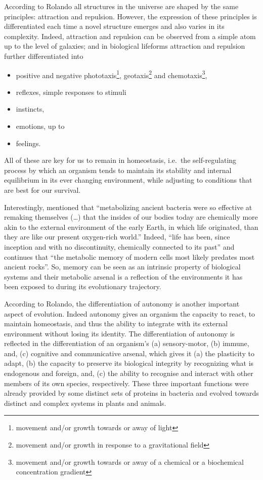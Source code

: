 \documentclass[
  11pt,
]{book}
\providecommand{\tightlist}{%
  \setlength{\itemsep}{0pt}\setlength{\parskip}{0pt}}
\begin{document}
According to Rolando all structures in the universe are shaped by the same principles: attraction and repulsion. However, the expression of these principles is differentiated each time a novel structure emerges and also varies in its complexity. Indeed, attraction and repulsion can be observed from a simple atom up to the level of galaxies; and in biological lifeforms attraction and repulsion further differentiated into

\begin{itemize}
\tightlist
\item
  positive and negative phototaxis\footnote{movement and/or growth towards or away of light}, geotaxis\footnote{movement and/or growth in response to a gravitational field} and chemotaxis\footnote{movement and/or growth towards or away of a chemical or a biochemical concentration gradient},
\item
  reflexes, simple responses to stimuli
\item
  instincts,
\item
  emotions, up to
\item
  feelings.
\end{itemize}

All of these are key for us to remain in homeostasis, i.e.~the self-regulating process by which an organism tends to maintain its stability and internal equilibrium in its ever changing environment, while adjusting to conditions that are best for our survival.

Interestingly, \citet{margulis1999} mentioned that ``metabolizing ancient bacteria were so effective at remaking themselves (\ldots) that the insides of our bodies today are chemically more akin to the external environment of the early Earth, in which life originated, than they are like our present oxygen-rich world.'' Indeed, ``life has been, since inception and with no discontinuity, chemically connected to its past'' and \citet{margulis1999} continues that ``the metabolic memory of modern cells most likely predates most ancient rocks''. So, memory can be seen as an intrinsic property of biological systems and their metabolic arsenal is a reflection of the environments it has been exposed to during its evolutionary trajectory.

According to Rolando, the differentiation of autonomy is another important aspect of evolution. Indeed autonomy gives an organism the capacity to react, to maintain homeostasis, and thus the ability to integrate with its external environment without losing its identity. The differentiation of autonomy is reflected in the differentiation of an organism's (a) sensory-motor, (b) immune, and, (c) cognitive and communicative arsenal, which gives it (a) the plasticity to adapt, (b) the capacity to preserve its biological integrity by recognizing what is endogenous and foreign, and, (c) the ability to recognise and interact with other members of its own species, respectively. These three important functions were already provided by some distinct sets of proteins in bacteria and evolved towards distinct and complex systems in plants and animals.
\end{document}
